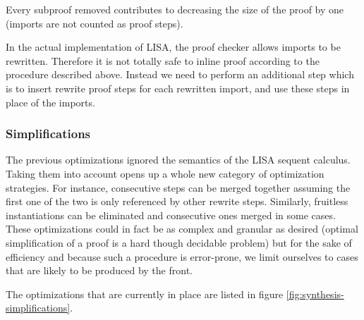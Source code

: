 Every subproof removed contributes to decreasing the size of the proof by one (imports are not counted as proof steps).

In the actual implementation of LISA, the proof checker allows imports to be rewritten. Therefore it is not totally safe to inline proof according to the procedure described above. Instead we need to perform an additional step which is to insert rewrite proof steps for each rewritten import, and use these steps in place of the imports.

\subsubsection{Simplifications}

The previous optimizations ignored the semantics of the LISA sequent calculus. Taking them into account opens up a whole new category of optimization strategies.
For instance, consecutive  steps can be merged together assuming the first one of the two is only referenced by other rewrite steps. Similarly, fruitless instantiations can be eliminated and consecutive ones merged in some cases. These optimizations could in fact be as complex and granular as desired (optimal simplification of a proof is a hard though decidable problem) but for the sake of efficiency and because such a procedure is error-prone, we limit ourselves to cases that are likely to be produced by the front.

The optimizations that are currently in place are listed in figure \ref{fig:synthesis-simplifications}.

